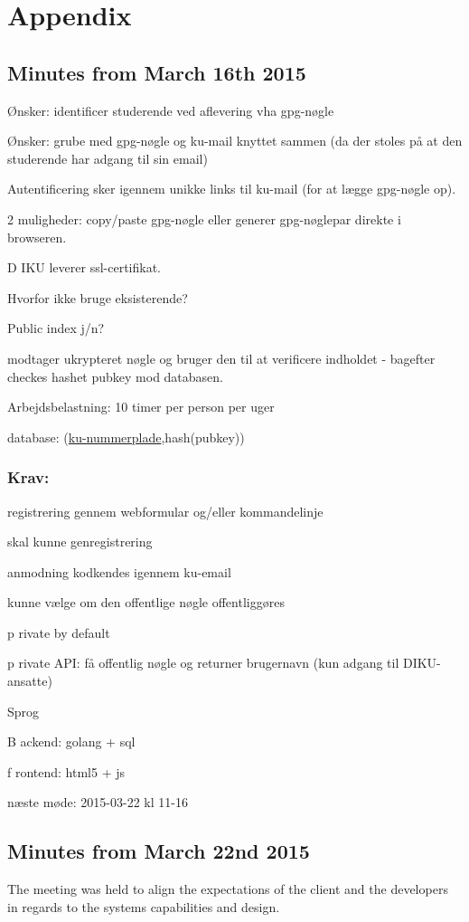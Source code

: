 \documentclass[11pt,a4paper]{article}
\let\OldItem\item
\newcommand{\SubItemStart}[1]{%
    \let\item\SubItemEnd
    \begin{SubItemList}[resume]%
        \OldItem #1%
}
\newcommand{\SubItemMiddle}[1]{%
    \OldItem #1%
}
\newcommand{\SubItemEnd}[1]{%
    \end{SubItemList}%
    \let\item\OldItem
    \item #1%
}
\newcommand*{\SubItem}[1]{%
    \let\SubItem\SubItemMiddle%
    \SubItemStart{#1}%
}%
\begin{document}
\newpage
\section{Appendix}
\subsection{Minutes from March 16th 2015}
\begin{itemize}
\item Ønsker: identificer studerende ved aflevering vha gpg-nøgle
\item Ønsker: grube med gpg-nøgle og ku-mail knyttet sammen (da der stoles på at den studerende har adgang til sin email)
\item Autentificering sker igennem unikke links til ku-mail (for at lægge gpg-nøgle op).
\SubItem 2 muligheder: copy/paste gpg-nøgle eller generer gpg-nøglepar direkte i browseren.
\item DIKU leverer ssl-certifikat.
\item Hvorfor ikke bruge eksisterende?
\item Public index j/n?
\item modtager ukrypteret nøgle og bruger den til at verificere indholdet - bagefter checkes hashet pubkey mod databasen.
\item Arbejdsbelastning: 10 timer per person per uger
\item database: (\underline{ku-nummerplade},hash(pubkey))
\end{itemize}
\subsubsection{Krav:}
\begin{itemize}
\item registrering gennem webformular og/eller kommandelinje
\item skal kunne genregistrering
\item anmodning kodkendes igennem ku-email
\item kunne vælge om den offentlige nøgle offentliggøres
\SubItem private by default
\item private API: få offentlig nøgle og returner brugernavn (kun adgang til DIKU-ansatte)
\item Sprog
\SubItem Backend: golang + sql
\SubItem frontend: html5 + js
\end{itemize}

næste møde:
2015-03-22 kl 11-16

\subsection{Minutes from March 22nd 2015}
The meeting was held to align the expectations of the client and the developers in regards to the systems capabilities and design.
\end{document}
